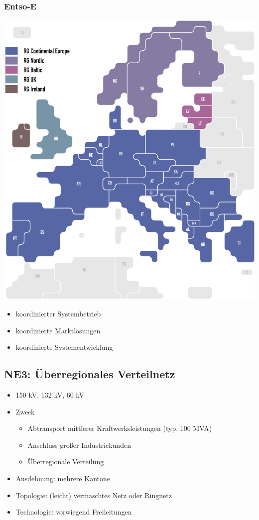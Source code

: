\subsubsection{Entso-E}

\begin{center}
    \includegraphics[width=0.95\columnwidth, align=c]{images/Entso_E.png}
\end{center}

\begin{itemize}
    \item koordinierter Systembetrieb
    \item koordinierte Marktlösungen
    \item koordinierte Systementwicklung
\end{itemize}




\subsection{NE3: Überregionales Verteilnetz}

\begin{itemize}
    \item 150 kV, 132 kV, 60 kV
    \item Zweck
    \begin{itemize}
        \item Abtransport mittlerer Kraftwerksleistungen (typ. 100 MVA)
        \item Anschluss großer Industriekunden
        \item Überregionale Verteilung
    \end{itemize}
    \item Ausdehnung: mehrere Kantone
    \item Topologie: (leicht) vermaschtes Netz oder Ringnetz
    \item Technologie: vorwiegend Freileitungen
\end{itemize}

